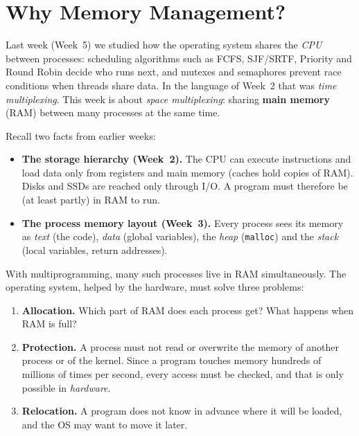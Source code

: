 \documentclass[11pt,a4paper]{article}
\newcommand{\term}[1]{\textbf{\color{mintdeep}#1}}
\newcommand{\cmd}[1]{\texttt{#1}}
\begin{document}
\setcounter{tocdepth}{1}
\tableofcontents

\section{Why Memory Management?}

Last week (Week~5) we studied how the operating system shares the \emph{CPU} between processes: scheduling algorithms such as FCFS, SJF/SRTF, Priority and Round Robin decide who runs next, and mutexes and semaphores prevent race conditions when threads share data. In the language of Week~2 that was \emph{time multiplexing}. This week is about \emph{space multiplexing}: sharing \term{main memory} (RAM) between many processes at the same time.

Recall two facts from earlier weeks:
\begin{itemize}
  \item \textbf{The storage hierarchy (Week~2).} The CPU can execute instructions and load data only from registers and main memory (caches hold copies of RAM). Disks and SSDs are reached only through I/O. A program must therefore be (at least partly) in RAM to run.
  \item \textbf{The process memory layout (Week~3).} Every process sees its memory as \emph{text} (the code), \emph{data} (global variables), the \emph{heap} (\cmd{malloc}) and the \emph{stack} (local variables, return addresses).
\end{itemize}

With multiprogramming, many such processes live in RAM simultaneously. The operating system, helped by the hardware, must solve three problems:
\begin{enumerate}[leftmargin=1.4em]
  \item \textbf{Allocation.} Which part of RAM does each process get? What happens when RAM is full?
  \item \textbf{Protection.} A process must not read or overwrite the memory of another process or of the kernel. Since a program touches memory hundreds of millions of times per second, every access must be checked, and that is only possible in \emph{hardware}.
  \item \textbf{Relocation.} A program does not know in advance where it will be loaded, and the OS may want to move it later.
\end{enumerate}

\end{document}
